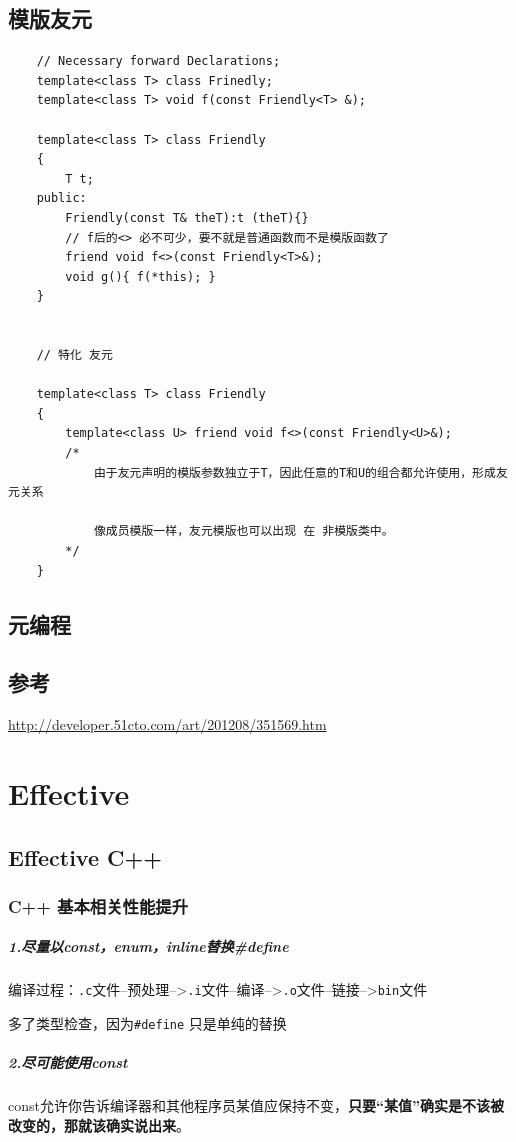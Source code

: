 \documentclass[UTF8,a4paper,12pt]{ctexbook}
\begin{document}
\section{模版友元}
	\begin{lstlisting}
	// Necessary forward Declarations;
	template<class T> class Frinedly;
	template<class T> void f(const Friendly<T> &);
	
	template<class T> class Friendly
	{
		T t;
	public:
		Friendly(const T& theT):t (theT){}
		// f后的<> 必不可少，要不就是普通函数而不是模版函数了
		friend void f<>(const Friendly<T>&);
		void g(){ f(*this); }
	}
	
	
	// 特化 友元
	
	template<class T> class Friendly
	{
		template<class U> friend void f<>(const Friendly<U>&);
		/*
			由于友元声明的模版参数独立于T，因此任意的T和U的组合都允许使用，形成友元关系
			
			像成员模版一样，友元模版也可以出现 在 非模版类中。
		*/
	}
	\end{lstlisting}	
	
\section{元编程}
	
	
	
\section{参考}\url{http://developer.51cto.com/art/201208/351569.htm}    

\chapter{Effective}
	\section{Effective C++}
		\subsection{C++ 基本相关性能提升}
		\paragraph{1.尽量以const，enum，inline替换\#define} 编译过程：\verb|.c|文件--预处理-->\verb|.i|文件--编译-->\verb|.o|文件--链接-->\verb|bin|文件
		
		多了类型检查，因为\verb|#define| 只是单纯的替换
		\paragraph{2.尽可能使用const} const允许你告诉编译器和其他程序员某值应保持不变，\textbf{只要“某值”确实是不该被改变的，那就该确实说出来}。
\end{document}
